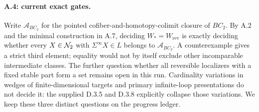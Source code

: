 \paragraph{A.4: current exact gates.}
Write $\mathcal A_{BC_2}$ for the pointed cofiber-and-homotopy-colimit closure of $BC_2$. By A.2 and the minimal construction in A.7, deciding $W_*=W_{\mathrm{rev}}$ is exactly deciding whether every $X\in\mathcal N_2$ with $\Sigma^\infty X\in L$ belongs to $\mathcal A_{BC_2}$. A counterexample gives a strict third element; equality would not by itself exclude other incomparable intermediate classes. The further question whether all reversible localizers with a fixed stable part form a set remains open in this run. Cardinality variations in wedges of finite-dimensional targets and primary infinite-loop presentations do not decide it: the supplied D.3.5 and D.3.8 explicitly collapse those variations. We keep these three distinct questions on the progress ledger.
